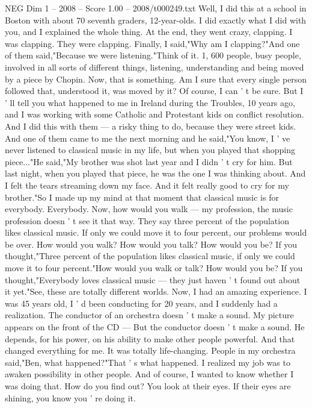 \begin{textsample}{NEG Dim 1 – 2008 – Score 1.00 – 2008/t000249.txt}
Well, I did this at a school in Boston with about 70 seventh graders, 12-year-olds.
I did exactly what I did with you, and I explained the whole thing.
At the end, they went crazy, clapping.
I was clapping.
They were clapping.
Finally, I said,"Why am I clapping?"And one of them said,"Because we were listening."Think of it. 1, 600 people, busy people, involved in all sorts of different things, listening, understanding and being moved by a piece by Chopin.
Now, that is something.
Am I sure that every single person followed that, understood it, was moved by it?
Of course, I can ' t be sure.
But I ' ll tell you what happened to me in Ireland during the Troubles, 10 years ago, and I was working with some Catholic and Protestant kids on conflict resolution.
And I did this with them — a risky thing to do, because they were street kids.
And one of them came to me the next morning and he said,"You know, I ' ve never listened to classical music in my life, but when you played that shopping piece..."He said,"My brother was shot last year and I didn ' t cry for him.
But last night, when you played that piece, he was the one I was thinking about.
And I felt the tears streaming down my face.
And it felt really good to cry for my brother."So I made up my mind at that moment that classical music is for everybody.
Everybody.
Now, how would you walk — my profession, the music profession doesn ' t see it that way.
They say three percent of the population likes classical music.
If only we could move it to four percent, our problems would be over.
How would you walk?
How would you talk?
How would you be?
If you thought,"Three percent of the population likes classical music, if only we could move it to four percent."How would you walk or talk?
How would you be?
If you thought,"Everybody loves classical music — they just haven ' t found out about it yet."See, these are totally different worlds.
Now, I had an amazing experience.
I was 45 years old, I ' d been conducting for 20 years, and I suddenly had a realization.
The conductor of an orchestra doesn ' t make a sound.
My picture appears on the front of the CD — But the conductor doesn ' t make a sound.
He depends, for his power, on his ability to make other people powerful.
And that changed everything for me.
It was totally life-changing.
People in my orchestra said,"Ben, what happened?"That ' s what happened.
I realized my job was to awaken possibility in other people.
And of course, I wanted to know whether I was doing that.
How do you find out?
You look at their eyes.
If their eyes are shining, you know you ' re doing it.

\end{textsample}
